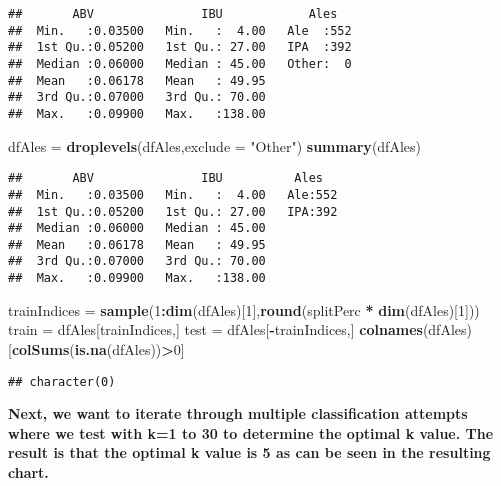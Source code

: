 \documentclass[
]{article}
\newenvironment{Shaded}{\begin{snugshade}}{\end{snugshade}}
\newcommand{\DataTypeTok}[1]{\textcolor[rgb]{0.13,0.29,0.53}{#1}}
\newcommand{\DecValTok}[1]{\textcolor[rgb]{0.00,0.00,0.81}{#1}}
\newcommand{\KeywordTok}[1]{\textcolor[rgb]{0.13,0.29,0.53}{\textbf{#1}}}
\newcommand{\NormalTok}[1]{#1}
\newcommand{\OperatorTok}[1]{\textcolor[rgb]{0.81,0.36,0.00}{\textbf{#1}}}
\newcommand{\StringTok}[1]{\textcolor[rgb]{0.31,0.60,0.02}{#1}}
\begin{document}
\begin{verbatim}
##       ABV               IBU            Ales    
##  Min.   :0.03500   Min.   :  4.00   Ale  :552  
##  1st Qu.:0.05200   1st Qu.: 27.00   IPA  :392  
##  Median :0.06000   Median : 45.00   Other:  0  
##  Mean   :0.06178   Mean   : 49.95              
##  3rd Qu.:0.07000   3rd Qu.: 70.00              
##  Max.   :0.09900   Max.   :138.00
\end{verbatim}

\begin{Shaded}
\begin{Highlighting}[]
\NormalTok{dfAles =}\StringTok{ }\KeywordTok{droplevels}\NormalTok{(dfAles,}\DataTypeTok{exclude =} \StringTok{"Other"}\NormalTok{)}
\KeywordTok{summary}\NormalTok{(dfAles)}
\end{Highlighting}
\end{Shaded}

\begin{verbatim}
##       ABV               IBU          Ales    
##  Min.   :0.03500   Min.   :  4.00   Ale:552  
##  1st Qu.:0.05200   1st Qu.: 27.00   IPA:392  
##  Median :0.06000   Median : 45.00            
##  Mean   :0.06178   Mean   : 49.95            
##  3rd Qu.:0.07000   3rd Qu.: 70.00            
##  Max.   :0.09900   Max.   :138.00
\end{verbatim}

\begin{Shaded}
\begin{Highlighting}[]
\NormalTok{trainIndices =}\StringTok{ }\KeywordTok{sample}\NormalTok{(}\DecValTok{1}\OperatorTok{:}\KeywordTok{dim}\NormalTok{(dfAles)[}\DecValTok{1}\NormalTok{],}\KeywordTok{round}\NormalTok{(splitPerc }\OperatorTok{*}\StringTok{ }\KeywordTok{dim}\NormalTok{(dfAles)[}\DecValTok{1}\NormalTok{]))}
\NormalTok{train =}\StringTok{ }\NormalTok{dfAles[trainIndices,]}
\NormalTok{test =}\StringTok{ }\NormalTok{dfAles[}\OperatorTok{-}\NormalTok{trainIndices,]}
\KeywordTok{colnames}\NormalTok{(dfAles)[}\KeywordTok{colSums}\NormalTok{(}\KeywordTok{is.na}\NormalTok{(dfAles))}\OperatorTok{>}\DecValTok{0}\NormalTok{]}
\end{Highlighting}
\end{Shaded}

\begin{verbatim}
## character(0)
\end{verbatim}

\textbf{Next, we want to iterate through multiple classification
attempts where we test with k=1 to 30 to determine the optimal k value.
The result is that the optimal k value is 5 as can be seen in the
resulting chart.}
\end{document}
